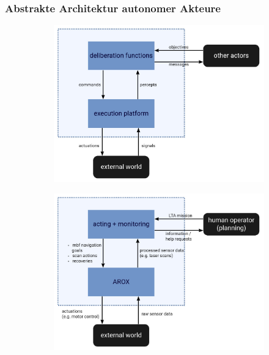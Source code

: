 \documentclass{beamer}
\begin{document}
\begin{frame}
  \frametitle{Abstrakte Architektur autonomer Akteure}
  \begin{figure}[H]
    \centering
    \begin{subfigure}[b]{0.49\textwidth}
        \centering
        \includegraphics[width=\textwidth]{img/GNT_actor_new.png}
    \end{subfigure}
    \hfill
    \begin{subfigure}[b]{0.49\textwidth}
        \centering
        \includegraphics[width=\textwidth]{img/MSC_actor_new.png}
    \end{subfigure}
  \end{figure}
\end{frame}
\end{document}

